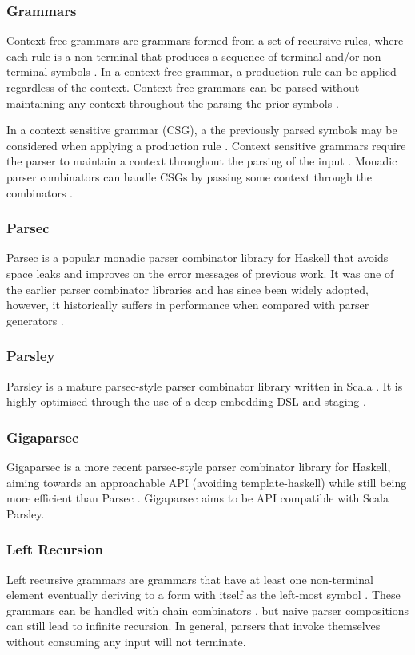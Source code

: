 \documentclass[11pt]{article}
\begin{document}
\subsubsection{Grammars}
Context free grammars are grammars formed from a set of recursive rules, where each rule is a non-terminal that produces a sequence of terminal and/or non-terminal symbols \cite{context}. In a context free grammar, a production rule can be applied regardless of the context. Context free grammars can be parsed without maintaining any context throughout the parsing the prior symbols \cite{parsley}.

In a context sensitive grammar (CSG), a the previously parsed symbols may be considered when applying a production rule \cite{context}. Context sensitive grammars require the parser to maintain a context throughout the parsing of the input \cite{parsley}. Monadic parser combinators can handle CSGs by passing some context through the combinators \cite{parsley}.

\subsubsection{Parsec}
Parsec \cite{parsec} is a popular monadic parser combinator library for Haskell that avoids space leaks and improves on the error messages of previous work. It was one of the earlier parser combinator libraries and has since been widely adopted, however, it historically suffers in performance when compared with parser generators \cite{staged-selective}.

\subsubsection{Parsley}
Parsley is a mature parsec-style parser combinator library written in Scala \cite{parsley}. It is highly optimised through the use of a deep embedding DSL and staging \cite{staged-selective}. 

\subsubsection{Gigaparsec}
Gigaparsec is a more recent parsec-style parser combinator library for Haskell, aiming towards an approachable API (avoiding template-haskell) while still being more efficient than Parsec \cite{gigaparsec}. Gigaparsec aims to be API compatible with Scala Parsley.

\subsubsection{Left Recursion}
Left recursive grammars are grammars that have at least one non-terminal element eventually deriving to a form with itself as the left-most symbol \cite{left-recursive}. These grammars can be handled with chain combinators \cite{design-patterns}, but naive parser compositions can still lead to infinite recursion. In general, parsers that invoke themselves without consuming any input will not terminate.
\end{document}
